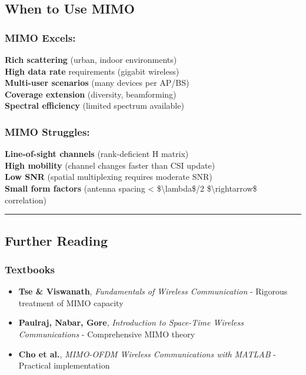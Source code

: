 \subsection{\texorpdfstring{ When to Use
MIMO}{ When to Use MIMO}}\label{when-to-use-mimo}

\subsubsection{MIMO Excels:}\label{mimo-excels}

\textbf{Rich scattering} (urban, indoor environments)\\
\textbf{High data rate} requirements (gigabit wireless)\\
\textbf{Multi-user scenarios} (many devices per AP/BS)\\
\textbf{Coverage extension} (diversity, beamforming)\\
\textbf{Spectral efficiency} (limited spectrum available)

\subsubsection{MIMO Struggles:}\label{mimo-struggles}

\textbf{Line-of-sight channels} (rank-deficient H matrix)\\
\textbf{High mobility} (channel changes faster than CSI update)\\
\textbf{Low SNR} (spatial multiplexing requires moderate SNR)\\
\textbf{Small form factors} (antenna spacing \textless{}
\$\textbackslash lambda\$/2 \$\textbackslash rightarrow\$ correlation)

\begin{center}\rule{0.5\linewidth}{0.5pt}\end{center}

\subsection{\texorpdfstring{ Further
Reading}{ Further Reading}}\label{further-reading}

\subsubsection{Textbooks}\label{textbooks}

\begin{itemize}
\tightlist
\item
  \textbf{Tse \& Viswanath}, \emph{Fundamentals of Wireless
  Communication} - Rigorous treatment of MIMO capacity
\item
  \textbf{Paulraj, Nabar, Gore}, \emph{Introduction to Space-Time
  Wireless Communications} - Comprehensive MIMO theory
\item
  \textbf{Cho et al.}, \emph{MIMO-OFDM Wireless Communications with
  MATLAB} - Practical implementation
\end{itemize}

